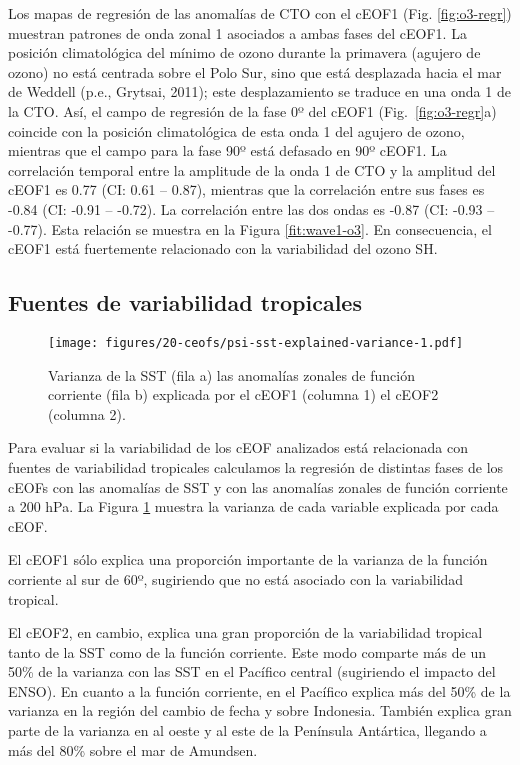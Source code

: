 \documentclass[12pt,oneside]{reedthesis}
\begin{document}
Los mapas de regresión de las anomalías de CTO con el cEOF1 (Fig. \ref{fig:o3-regr}) muestran patrones de onda zonal 1 asociados a ambas fases del cEOF1.
La posición climatológica del mínimo de ozono durante la primavera (agujero de ozono) no está centrada sobre el Polo Sur, sino que está desplazada hacia el mar de Weddell (p.e., Grytsai, 2011); este desplazamiento se traduce en una onda 1 de la CTO.
Así, el campo de regresión de la fase 0º del cEOF1 (Fig.~\ref{fig:o3-regr}a) coincide con la posición climatológica de esta onda 1 del agujero de ozono, mientras que el campo para la fase 90º está defasado en 90º cEOF1.
La correlación temporal entre la amplitude de la onda 1 de CTO y la amplitud del cEOF1 es 0.77 (CI: 0.61 -- 0.87), mientras que la correlación entre sus fases es -0.84 (CI: -0.91 -- -0.72).
La correlación entre las dos ondas es -0.87 (CI: -0.93 -- -0.77).
Esta relación se muestra en la Figura \ref{fit:wave1-o3}.
En consecuencia, el cEOF1 está fuertemente relacionado con la variabilidad del ozono SH.

\hypertarget{fuentes-de-variabilidad-tropicales}{%
\subsection{Fuentes de variabilidad tropicales}\label{fuentes-de-variabilidad-tropicales}}


\begin{figure}
\centering
\texttt{[image: figures/20-ceofs/psi-sst-explained-variance-1.pdf]}
\caption{\label{fig:psi-sst-explained-variance}Varianza de la SST (fila a) las anomalías zonales de función corriente (fila b) explicada por el cEOF1 (columna 1) el cEOF2 (columna 2).}
\end{figure}
Para evaluar si la variabilidad de los cEOF analizados está relacionada con fuentes de variabilidad tropicales calculamos la regresión de distintas fases de los cEOFs con las anomalías de SST y con las anomalías zonales de función corriente a 200 hPa.
La Figura \ref{fig:psi-sst-explained-variance} muestra la varianza de cada variable explicada por cada cEOF.

El cEOF1 sólo explica una proporción importante de la varianza de la función corriente al sur de 60º, sugiriendo que no está asociado con la variabilidad tropical.

El cEOF2, en cambio, explica una gran proporción de la variabilidad tropical tanto de la SST como de la función corriente.
Este modo comparte más de un 50\% de la varianza con las SST en el Pacífico central (sugiriendo el impacto del ENSO).
En cuanto a la función corriente, en el Pacífico explica más del 50\% de la varianza en la región del cambio de fecha y sobre Indonesia.
También explica gran parte de la varianza en al oeste y al este de la Península Antártica, llegando a más del 80\% sobre el mar de Amundsen.
\end{document}
